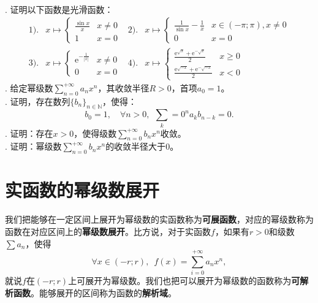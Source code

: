 \documentclass[12pt,UTF8]{ctexbook}
\begin{document}
\begin{appendix}
\begin{xt}
    \mbox{} \\
    . 证明以下函数是光滑函数：
    \begin{align*}
        1).& 
        x \mapsto \begin{cases}
            \frac{\sin{x}}{x} & x\neq 0 \\
            1 & x = 0 
        \end{cases}
        &2).&
        x \mapsto \begin{cases}
            \frac{1}{\sin{x}} - \frac{1}{x} & x\in (-\pi;\pi), x\neq 0 \\
            0 & x = 0 
        \end{cases} \\
        3).& 
        x \mapsto \begin{cases}
            \mathrm{e}^{-\frac{1}{|x|}} & x\neq 0 \\
            0 & x = 0 
        \end{cases}
        &4).&
        x \mapsto \begin{cases}
            \frac{\mathrm{e}^{\sqrt{x}} + \mathrm{e}^{-\sqrt{x}}}{2} & x\geqslant 0 \\
            \frac{\mathrm{e}^{\sqrt{-x}} + \mathrm{e}^{-\sqrt{-x}}}{2} & x < 0 
        \end{cases}
    \end{align*}
    . 给定幂级数$\sum_{n=0}^{+\infty} a_n x^n$，其收敛半径$R>0$，首项$a_0=1$。\\
    . 证明，存在数列$\{b_n\}_{n\in\mathbb{N}}$，使得：
    $$
    b_0 = 1, \quad \forall n > 0, \;\, \sum_k=0^n a_k b_{n-k} = 0.
    $$
    . 证明：存在$x>0$，使得级数$\sum_{n=0}^{+\infty} b_n x^n$收敛。\\
    . 证明：幂级数$\sum_{n=0}^{+\infty} b_n x^n$的收敛半径大于$0$。
\end{xt}

\section{实函数的幂级数展开}

我们把能够在一定区间上展开为幂级数的实函数称为\textbf{可展函数}，对应的幂级数称为函数在对应区间上的\textbf{幂级数展开}。比方说，对于实函数$f$，如果有$r>0$和级数$\sum a_n$，使得
$$\forall x\in (-r;r),\,\,\, f(x) = \sum_{i=0}^{+\infty} a_n x^n,$$
就说$f$在$(-r;r)$上可展开为幂级数。我们也把可以展开为幂级数的函数称为\textbf{可解析函数}。能够展开的区间称为函数的\textbf{解析域}。


\end{appendix}
\end{document}
